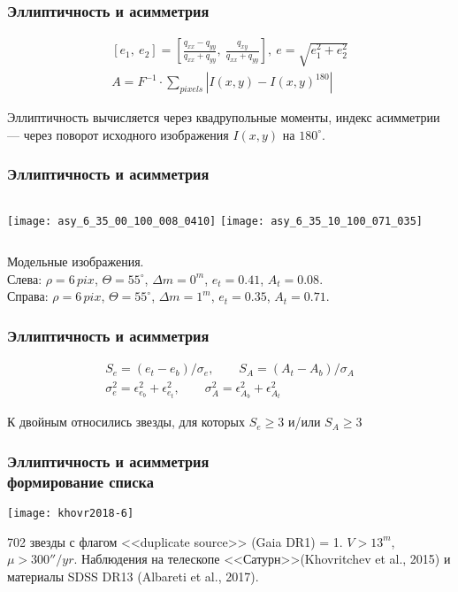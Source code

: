 \begin{frame}
\frametitle{Эллиптичность и асимметрия}
\begin{center}
{\small
\begin{align*}
\left[e_1,~e_2\right] = \left[\frac{q_{xx}-q_{yy}}{q_{xx}+q_{yy}},~\frac{q_{xy}}{q_{xx}+q_{yy}}\right],\: e = \sqrt{e_1^2+e_2^2}\\[15pt]
A = F^{-1}\cdot \sum_{pixels} |I(x,y)-I(x,y)^{180}|
\end{align*}
}
\end{center}
{\footnotesize
	Эллиптичность вычисляется через квадрупольные моменты, индекс асимметрии --- через поворот исходного изображения $I(x,y)$ на $180^\circ$.
}
\end{frame}

\begin{frame}
\frametitle{Эллиптичность и асимметрия}
\begin{center}
\begin{columns}
	\texttt{[image: asy\_6\_35\_00\_100\_008\_0410]}
	\texttt{[image: asy\_6\_35\_10\_100\_071\_035]}
\end{columns}
\end{center}
{\footnotesize
	Модельные изображения.\\ Слева: $\rho = 6\,pix$, $\Theta = 55^{\circ}$, $\Delta m = 0^m$, $e_t = 0.41$, $A_t = 0.08$.\\ Справа:  $\rho = 6\,pix$, $\Theta = 55^{\circ}$, $\Delta m = 1^m$, $e_t = 0.35$, $A_t = 0.71$.
}
\end{frame}

\begin{frame}
\frametitle{Эллиптичность и асимметрия}
\begin{center}
{\small
\begin{align*}
	S_e=(e_t-e_b)/\sigma_e, \qquad S_A=(A_t-A_b)/\sigma_A\\[10pt]
	\sigma_e^2=\epsilon_{e_b}^2+\epsilon_{e_t}^2, \qquad \sigma_A^2=\epsilon_{A_b}^2+\epsilon_{A_t}^2
\end{align*}
}
\end{center}
{\footnotesize
	К двойным относились звезды, для которых $S_e \geqslant 3$ и/или $S_A \geqslant 3$
}
\end{frame}

\begin{frame}
\frametitle{Эллиптичность и асимметрия\\{\small формирование списка}}
\begin{center}
	\texttt{[image: khovr2018-6]}
\end{center}
{\scriptsize
	702 звезды с флагом <<duplicate source>> (Gaia DR1) = 1. $V>13^m$, $\mu>300''/yr$. Наблюдения на телескопе <<Сатурн>>(Khovritchev et al., 2015) и материалы SDSS DR13 (Albareti et al., 2017).
}
\end{frame}

